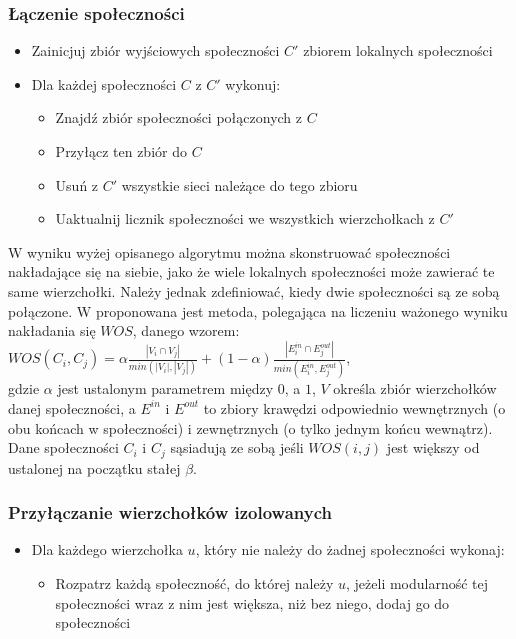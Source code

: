 \documentclass{article}
\begin{document}
\subsubsection{Łączenie społeczności}
\begin{itemize}
\item Zainicjuj zbiór wyjściowych społeczności $C'$ zbiorem lokalnych społeczności
\item Dla każdej społeczności $C$ z $C'$ wykonuj:
\begin{itemize}
\item Znajdź zbiór społeczności połączonych z $C$
\item Przyłącz ten zbiór do $C$
\item Usuń z $C'$ wszystkie sieci należące do tego zbioru
\item Uaktualnij licznik społeczności we wszystkich wierzchołkach z $C'$
\end{itemize}
\end{itemize}

W wyniku wyżej opisanego algorytmu można skonstruować społeczności nakładające się na siebie, jako że wiele lokalnych społeczności może zawierać te same wierzchołki. Należy jednak zdefiniować, kiedy dwie społeczności są ze sobą połączone. W \cite{bt-paper1} proponowana jest metoda, polegająca na liczeniu ważonego wyniku nakładania się $WOS$, danego wzorem:\\
$WOS(C_i,C_j) = \alpha\frac{|V_i \cap V_j|}{min(|V_i|,|V_j|)} + (1-\alpha)\frac{|E^{in}_i \cap E^{out}_j|}{min(E^{in}_i,E^{out}_j)}$, \\gdzie $\alpha$ jest ustalonym parametrem między $0$, a $1$, $V$ określa zbiór wierzchołków danej społeczności, a $E^{in}$ i $E^{out}$ to zbiory krawędzi odpowiednio wewnętrznych (o obu końcach w społeczności) i zewnętrznych (o tylko jednym końcu wewnątrz). Dane społeczności $C_i$ i $C_j$ sąsiadują ze sobą jeśli $WOS(i,j)$ jest większy od ustalonej na początku stałej $\beta$.
\subsubsection{Przyłączanie wierzchołków izolowanych}
\begin{itemize}
\item Dla każdego wierzchołka $u$, który nie należy do żadnej społeczności wykonaj:
\begin{itemize}
\item Rozpatrz każdą społeczność, do której należy $u$, jeżeli modularność tej społeczności wraz z nim jest większa, niż bez niego, dodaj go do społeczności
\end{itemize}
\end{itemize}
\end{document}
